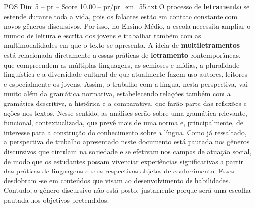 \begin{textsample}{POS Dim 5 – pr – Score 10.00 – pr/pr\_em\_55.txt}
O processo de \textbf{letramento} se estende durante toda a vida, pois os falantes estão em contato constante com novos gêneros discursivos.
Por isso, no Ensino Médio, a escola necessita ampliar o mundo de leitura e escrita dos jovens e trabalhar também com as multimodalidades em que o texto se apresenta.
A ideia de \textbf{multiletramentos} está relacionada diretamente a essas práticas de \textbf{letramento} contemporâneas, que compreendem as múltiplas linguagens, as semioses e mídias, a pluralidade linguística e a diversidade cultural de que atualmente fazem uso autores, leitores e especialmente os jovens.
Assim, o trabalho com a língua, nesta perspectiva, vai muito além da gramática normativa, estabelecendo relações também com a gramática descritiva, a histórica e a comparativa, que farão parte das reflexões e ações nos textos.
Nesse sentido, as análises serão sobre uma gramática relevante, funcional, contextualizada, que prevê mais de uma norma e, principalmente, de interesse para a construção do conhecimento sobre a língua.
Como já ressaltado, a perspectiva de trabalho apresentado neste documento está pautada nos gêneros discursivos que circulam na sociedade e se efetivam nos campos de atuação social, de modo que os estudantes possam vivenciar experiências significativas a partir das práticas de linguagens e seus respectivos objetos de conhecimento.
Esses desdobram -se em conteúdos que visam ao desenvolvimento de habilidades.
Contudo, o gênero discursivo não está posto, justamente porque será uma escolha pautada nos objetivos pretendidos.

\end{textsample}
